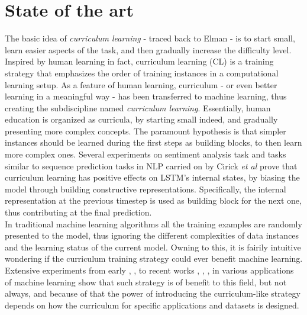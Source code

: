 \section{State of the art}
The basic idea of \textit{curriculum learning} - traced back to Elman - is to start small, learn easier aspects
of the task, and then gradually increase the difficulty level.
Inspired by human learning in fact, curriculum learning (CL) is a training strategy that emphasizes
the order of training instances in a computational learning setup.
As a feature of human learning, curriculum - or even better learning in a meaningful way -
has been transferred to machine learning, thus creating the subdiscipline named
\textit{curriculum learning}.
Essentially, human education is organized as curricula, by starting small indeed, and gradually presenting more complex
concepts. The paramount hypothesis is that simpler instances should be learned
during the first steps as building blocks, to then learn more complex ones. Several experiments on sentiment 
analysis task and tasks similar to sequence prediction tasks in NLP carried on by Cirick \textit{et al} \cite{Cirik2016VisualizingAU} prove that
curriculum learning has positive effects on LSTM's internal states, by biasing the model through building constructive representations. 
Specifically, the internal representation at the previous timestep is used as building block for the next one, thus
contributing at the final prediction.\\
In traditional machine learning algorithms all the training examples are randomly presented to the model,
thus ignoring the different complexities of data instances and the learning status of the current model. 
Owning to this, it is fairily intuitive wondering if the curriculum training strategy could ever benefit machine learning.
Extensive experiments from early \cite{bengio2009curriculum}, \cite{kumar2010self}, \cite{zaremba2014learning} to recent works \cite{fan2018learning}, \cite{graves2017automated}, \cite{hacohen2019power}, \cite{platanios2019competence} in various applications of machine learning show that such strategy is of benefit to this field, but not always, and 
because of that the power of introducing the curriculum-like strategy depends on how the curriculum for specific applications and datasets is designed.

